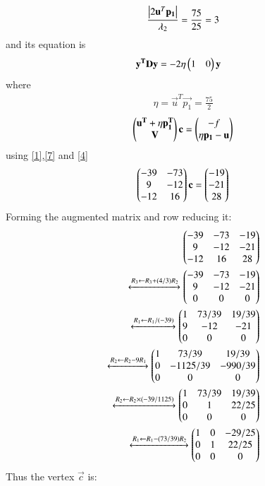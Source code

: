 \documentclass[journal,12pt,twocolumn]{IEEEtran}
\begin{document}
\begin{align}
\frac{\left\vert2\mathbf{u}^T\mathbf{p_1}\right\vert}{\lambda_2}
    = \frac{75}{25}=3
\end{align}
and its equation is
\begin{align}
    \mathbf{y^T}\mathbf{D}\mathbf{y}&=-2\eta\begin{pmatrix}1&0\end{pmatrix}\mathbf{y}\label{5}
\end{align}
where
\begin{align}
    \eta=\vec{u}^T\vec{p_1}=\frac{75}{2}
\end{align}
\begin{align}
    \begin{pmatrix}\mathbf{u^T}+\eta\mathbf{p_1^T} \\ \mathbf{V}\end{pmatrix}\mathbf{c}=
    \begin{pmatrix}-f \\ \eta\mathbf{p_1}-\mathbf{u}\end{pmatrix} 
\end{align}
using \eqref{1},\eqref{7} and \eqref{4}
\begin{align}
    \begin{pmatrix}-39& -73 \\ 9 & -12 \\  -12 & 16 \end{pmatrix}\mathbf{c}=\begin{pmatrix}-19 \\ -21\\ 28\end{pmatrix} 
\end{align}
Forming the augmented matrix and row reducing it:
\begin{align}
\begin{pmatrix}-39 & -73 & -19\\9 & -12 & -21 \\-12 & 16 &28 \end{pmatrix}\\
\xleftrightarrow[]{R_3\leftarrow R_3+(4/3)R_2} 
\begin{pmatrix}-39 & -73 & -19\\9 & -12 & -21 \\0 & 0 &0 \end{pmatrix}\\
\xleftrightarrow[]{R_1\leftarrow R_1/(-39)} 
\begin{pmatrix}1 & 73/39 & 19/39\\9 & -12 & -21 \\0 & 0 &0 \end{pmatrix}\\
\xleftrightarrow[]{R_2\leftarrow R_2-9R_1}
\begin{pmatrix}1 & 73/39 & 19/39\\0 & -1125/39 & -990/39 \\0 & 0 &0\end{pmatrix}\\ 
\xleftrightarrow[]{R_2\leftarrow R_2 \times (-39/1125)}
\begin{pmatrix}1 & 73/39 & 19/39\\0 & 1 & 22/25 \\0 & 0 &0\end{pmatrix}\\
\xleftrightarrow[]{R_1\leftarrow R_1 -(73/39)R_2}
\begin{pmatrix}1 & 0 & -29/25\\0 & 1 & 22/25 \\0 & 0 &0\end{pmatrix}
\end{align}
Thus the vertex $\vec{c}$ is:
\end{document}
